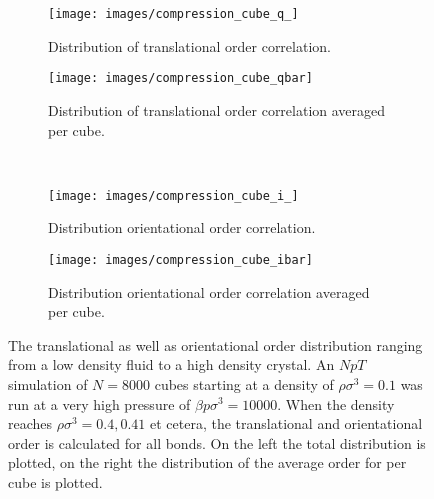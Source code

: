 \documentclass[thesis]{subfiles}
\begin{document}
\begin{figure}[h]
	\centering
	\begin{subfigure}{0.48\textwidth}
		\centering
		\texttt{[image: images/compression\_cube\_q\_]}
		\caption{Distribution of translational order correlation.}\label{fig:compression_cubea}
	\end{subfigure}
	\begin{subfigure}{0.51\textwidth}
		\centering
		\texttt{[image: images/compression\_cube\_qbar]}
		\caption{Distribution of translational order correlation averaged per cube.}\label{fig:compression_cubeb}
	\end{subfigure}\\\vspace{10pt}
	\begin{subfigure}{0.48\textwidth}
		\centering
		\texttt{[image: images/compression\_cube\_i\_]}
		\caption{Distribution orientational order correlation.}\label{fig:compression_cubec}
	\end{subfigure}
	\begin{subfigure}{0.51\textwidth}
		\centering
		\texttt{[image: images/compression\_cube\_ibar]}
		\caption{Distribution orientational order correlation averaged per cube.}\label{fig:compression_cubed}
	\end{subfigure}
	\caption{The translational as well as orientational order distribution ranging from a low density fluid to a high density crystal. %
	An $NpT$ simulation of $N = 8000$ cubes starting at a density of $\rho \sigma^3 = 0.1$ was run at a very high pressure of $\beta p \sigma^3 = 10000$. When the density reaches $\rho \sigma^3 = 0.4, 0.41$ et cetera, the translational and orientational order is calculated for all bonds. On the left the total distribution is plotted, on the right the distribution of the average order for per cube is plotted.}
	\label{fig:compression_cube}
\end{figure}
\end{document}
